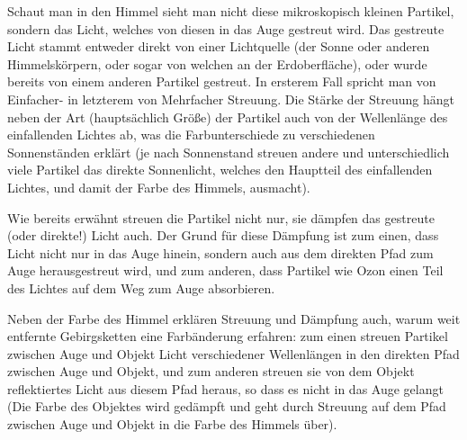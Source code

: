 Schaut man in den Himmel sieht man nicht diese mikroskopisch kleinen Partikel, sondern das Licht, welches von diesen in
das Auge gestreut wird. Das gestreute Licht stammt entweder direkt von einer Lichtquelle (der Sonne oder anderen
Himmelskörpern, oder sogar von welchen an der Erdoberfläche), oder wurde bereits von einem anderen Partikel gestreut. In
ersterem Fall spricht man von Einfacher- in letzterem von Mehrfacher Streuung. Die Stärke der Streuung hängt neben der
Art (hauptsächlich Größe) der Partikel auch von der Wellenlänge des einfallenden Lichtes ab, was die Farbunterschiede zu
verschiedenen Sonnenständen erklärt (je nach Sonnenstand streuen andere und unterschiedlich viele Partikel das direkte
Sonnenlicht, welches den Hauptteil des einfallenden Lichtes, und damit der Farbe des Himmels, ausmacht).

Wie bereits erwähnt streuen die Partikel nicht nur, sie dämpfen das gestreute (oder direkte!) Licht auch. Der Grund für
diese Dämpfung ist zum einen, dass Licht nicht nur in das Auge hinein, sondern auch aus dem direkten Pfad zum Auge
herausgestreut wird, und zum anderen, dass Partikel wie Ozon einen Teil des Lichtes auf dem Weg zum Auge absorbieren.

Neben der Farbe des Himmel erklären Streuung und Dämpfung auch, warum weit entfernte Gebirgsketten eine Farbänderung
erfahren: zum einen streuen Partikel zwischen Auge und Objekt Licht verschiedener Wellenlängen in den direkten Pfad
zwischen Auge und Objekt, und zum anderen streuen sie von dem Objekt reflektiertes Licht aus diesem Pfad heraus, so dass
es nicht in das Auge gelangt (Die Farbe des Objektes wird gedämpft und geht durch Streuung auf dem Pfad zwischen Auge
und Objekt in die Farbe des Himmels über).

